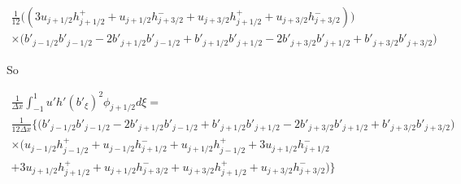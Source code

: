 \documentclass[12pt]{article}
\begin{document}
\begin{multline*}
\frac{1}{12} \bigg(\left( 3u_{j+1/2} h^+_{j+1/2}  + u_{j+1/2} h^-_{j+3/2} +  u_{j+3/2} h^+_{j+1/2}  + u_{j+3/2}h^-_{j+3/2}\right)\bigg)\\\times \big(b'_{j-1/2}b'_{j-1/2} -  2b'_{j+1/2}b'_{j-1/2} + b'_{j+1/2}b'_{j+1/2} - 2b'_{j+3/2}b'_{j+1/2}  +  b'_{j+3/2}b'_{j+3/2} \big)
\end{multline*}

So

\begin{multline*}
\frac{1}{\Delta x} \int_{-1}^{1} u' h' (b'_\xi)^2 \phi_{j +1/2} d \xi = \\
\frac{1}{12\Delta x} 
\bigg\lbrace\bigg(b'_{j-1/2}b'_{j-1/2} - 2b'_{j+1/2}b'_{j-1/2}+ b'_{j+1/2}b'_{j+1/2}  - 2b'_{j+3/2}b'_{j+1/2}  +  b'_{j+3/2}b'_{j+3/2} \bigg)\\ \times\bigg( u_{j-1/2}h^+_{j-1/2} + u_{j-1/2}h^-_{j+1/2} + u_{j+1/2}h^+_{j-1/2} + 3u_{j+1/2}h^-_{j+1/2} \\+ 3u_{j+1/2} h^+_{j+1/2}  + u_{j+1/2} h^-_{j+3/2} +  u_{j+3/2} h^+_{j+1/2}  + u_{j+3/2}h^-_{j+3/2} \bigg) \bigg\rbrace
\end{multline*}
\end{document}
